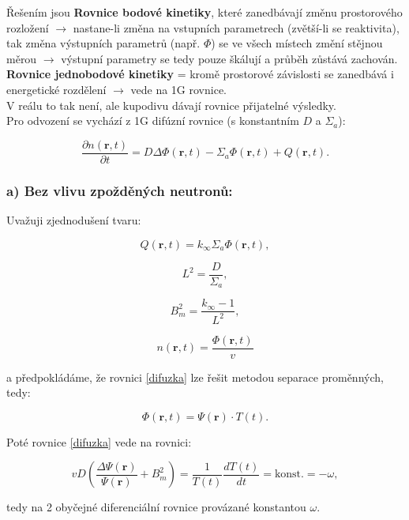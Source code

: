 Řešením jsou \textbf{Rovnice bodové kinetiky}, které zanedbávají změnu prostorového rozložení $\rightarrow$ nastane-li změna na vstupních parametrech (zvětší-li se reaktivita), tak změna výstupních parametrů (např. $\Phi$) se ve všech místech změní stějnou měrou $\rightarrow$ výstupní parametry se tedy pouze škálují a průběh zůstává zachován.\\

\textbf{Rovnice jednobodové kinetiky} = kromě prostorové závislosti se zanedbává i energetické rozdělení $\rightarrow$ vede na 1G rovnice.\\

V reálu to tak není, ale kupodivu dávají rovnice přijatelné výsledky.\\

Pro odvození se vychází z 1G difúzní rovnice (s konstantním $D$ a $\Sigma_a$):

\begin{equation}
  \boxed{
  \dfrac{\partial n(\textbf{r}, t)}{\partial t} = D \Delta \Phi (\textbf{r}, t) - \Sigma_a \Phi (\textbf{r}, t) + Q (\textbf{r}, t).
  \label{difuzka}}
\end{equation}

\subsubsection{a) Bez vlivu zpožděných neutronů:}

Uvažuji zjednodušení tvaru:

$$ Q (\textbf{r}, t) = k_\infty \Sigma_a \Phi (\textbf{r}, t), $$

$$ L^2 = \dfrac{D}{\Sigma_a}, $$

$$ B_m^2 = \dfrac{k_\infty - 1}{L^2}, $$

$$ n(\textbf{r}, t) = \dfrac{\Phi (\textbf{r}, t)}{v}$$

a předpokládáme, že rovnici \eqref{difuzka} lze řešit metodou separace proměnných, tedy:

$$ \Phi (\textbf{r}, t) = \Psi (\textbf{r}) \cdot T(t). $$

Poté rovnice \eqref{difuzka} vede na rovnici:

\begin{equation}
  v D \left ( \dfrac{\Delta \Psi (\textbf{r})}{\Psi (\textbf{r})} + B_m^2 \right ) = \dfrac{1}{T(t)} \dfrac{d T(t)}{d t} = \text{konst.} = - \omega,
  \label{difuzka_v_separaci}
\end{equation}

tedy na 2 obyčejné diferenciální rovnice provázané konstantou $\omega$.\\

